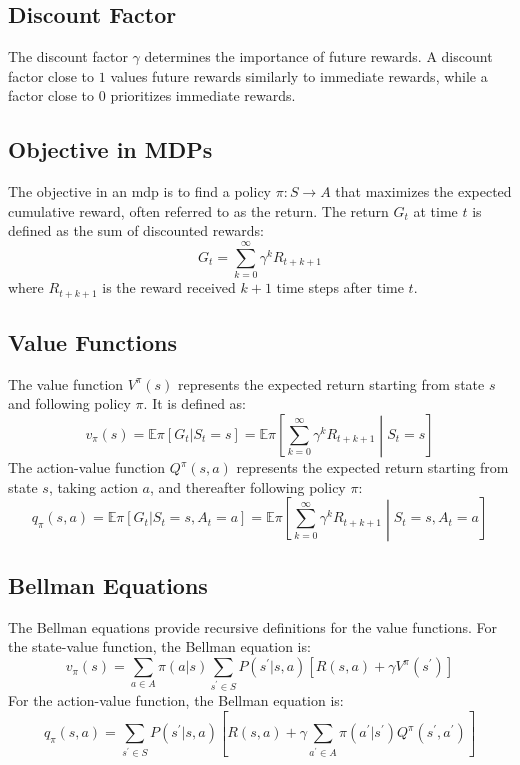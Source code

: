 \subsection*{Discount Factor}
The discount factor \(\gamma\) determines the importance of future rewards. 
A discount factor close to \(1\) values future rewards similarly to immediate rewards, 
while a factor close to \(0\) prioritizes immediate rewards.

\subsection*{Objective in MDPs}
The objective in an \gls{mdp} is to find a policy \(\pi: S \rightarrow A\) 
that maximizes the expected cumulative reward, often referred to as the return. 
The return \(G_t\) at time \(t\) is defined as the sum of discounted rewards:
\[
    G_t = \sum_{k=0}^{\infty} \gamma^k R_{t+k+1}
\]
where \(R_{t+k+1}\) is the reward received \(k+1\) time steps after time \(t\).

\subsection*{Value Functions}
The value function \(V^\pi(s)\) represents the expected return starting from state \(s\) and 
following policy \(\pi\). It is defined as:
\[
    v_\pi(s) = \mathbb{E}\pi [G_t | S_t = s] = \mathbb{E}\pi 
    \left[ \sum_{k=0}^{\infty} \gamma^k R_{t+k+1} \middle| S_t = s \right]
\]
The action-value function \(Q^\pi(s, a)\) represents the expected return starting from state \(s\),
taking action \(a\), and thereafter following policy \(\pi\):
\[ 
    q_\pi(s, a) = \mathbb{E}\pi [G_t | S_t = s, A_t = a] 
    = \mathbb{E}\pi \left[ \sum_{k=0}^{\infty} \gamma^k R_{t+k+1} \middle| S_t =s, A_t =a \right]
\]

\subsection*{Bellman Equations}
The Bellman equations provide recursive definitions for the value functions. 
For the state-value function, the Bellman equation is:
\[
    v_\pi(s) = \sum_{a \in A} \pi(a|s) \sum_{s^\prime \in S} P(s^\prime|s, a) 
    \left[R(s, a) + \gamma V^\pi(s^\prime)\right]
\]
For the action-value function, the Bellman equation is:
\[
    q_\pi(s, a) = \sum_{s^\prime \in S} P(s^\prime|s, a)\left[R(s, a) 
    + \gamma \sum_{a^\prime \in A} \pi(a^\prime|s^\prime) Q^\pi(s^\prime, a^\prime)\right]
\]

